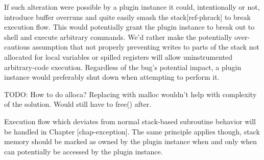If such alteration were possible by a plugin instance it could, intentionally or
not, introduce buffer overruns and quite easily smash the stack[ref-phrack] to
break execution flow.
This would potentially grant the plugin instance to break out to shell and
execute arbitrary commands.
We'd rather make the potentially over-cautious assumption that not properly
preventing writes to parts of the stack not allocated for local variables or
spilled registers will allow uninstrumented arbitrary-code execution.
Regardless of the bug's potential impact, a plugin instance would preferably
shut down when attempting to perform it.

TODO: How to do alloca? Replacing with malloc wouldn't help with complexity of
the solution. Would still have to free() after.

Execution flow which deviates from normal stack-based subroutine behavior will
be handled in Chapter [chap-exception].
The same principle applies though, stack memory should be marked as owned by the
plugin instance when and only when can potentially be accessed by the plugin
instance.
